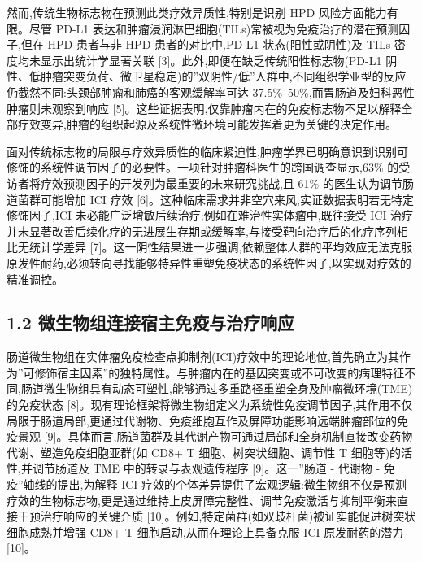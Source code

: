 然而,传统生物标志物在预测此类疗效异质性,特别是识别 HPD 风险方面能力有限。尽管 PD-L1 表达和肿瘤浸润淋巴细胞(TILs)常被视为免疫治疗的潜在预测因子,但在 HPD 患者与非 HPD 患者的对比中,PD-L1 状态(阳性或阴性)及 TILs 密度均未显示出统计学显著关联 {[}3{]}。此外,即便在缺乏传统阳性标志物(PD-L1 阴性、低肿瘤突变负荷、微卫星稳定)的''双阴性/低''人群中,不同组织学亚型的反应仍截然不同:头颈部肿瘤和肺癌的客观缓解率可达 37.5\%--50\%,而胃肠道及妇科恶性肿瘤则未观察到响应 {[}5{]}。这些证据表明,仅靠肿瘤内在的免疫标志物不足以解释全部疗效变异,肿瘤的组织起源及系统性微环境可能发挥着更为关键的决定作用。

面对传统标志物的局限与疗效异质性的临床紧迫性,肿瘤学界已明确意识到识别可修饰的系统性调节因子的必要性。一项针对肿瘤科医生的跨国调查显示,63\% 的受访者将疗效预测因子的开发列为最重要的未来研究挑战,且 61\% 的医生认为调节肠道菌群可能增加 ICI 疗效 {[}6{]}。这种临床需求并非空穴来风,实证数据表明若无特定修饰因子,ICI 未必能广泛增敏后续治疗;例如在难治性实体瘤中,既往接受 ICI 治疗并未显著改善后续化疗的无进展生存期或缓解率,与接受靶向治疗后的化疗序列相比无统计学差异 {[}7{]}。这一阴性结果进一步强调,依赖整体人群的平均效应无法克服原发性耐药,必须转向寻找能够特异性重塑免疫状态的系统性因子,以实现对疗效的精准调控。

\subsection{1.2 微生物组连接宿主免疫与治疗响应}\label{ux5faeux751fux7269ux7ec4ux8fdeux63a5ux5bbfux4e3bux514dux75abux4e0eux6cbbux7597ux54cdux5e94}

肠道微生物组在实体瘤免疫检查点抑制剂(ICI)疗效中的理论地位,首先确立为其作为''可修饰宿主因素''的独特属性。与肿瘤内在的基因突变或不可改变的病理特征不同,肠道微生物组具有动态可塑性,能够通过多重路径重塑全身及肿瘤微环境(TME)的免疫状态 {[}8{]}。现有理论框架将微生物组定义为系统性免疫调节因子,其作用不仅局限于肠道局部,更通过代谢物、免疫细胞互作及屏障功能影响远端肿瘤部位的免疫景观 {[}9{]}。具体而言,肠道菌群及其代谢产物可通过局部和全身机制直接改变药物代谢、塑造免疫细胞亚群(如 CD8+ T 细胞、树突状细胞、调节性 T 细胞等)的活性,并调节肠道及 TME 中的转录与表观遗传程序 {[}9{]}。这一''肠道 - 代谢物 - 免疫''轴线的提出,为解释 ICI 疗效的个体差异提供了宏观逻辑:微生物组不仅是预测疗效的生物标志物,更是通过维持上皮屏障完整性、调节免疫激活与抑制平衡来直接干预治疗响应的关键介质 {[}10{]}。例如,特定菌群(如双歧杆菌)被证实能促进树突状细胞成熟并增强 CD8+ T 细胞启动,从而在理论上具备克服 ICI 原发耐药的潜力 {[}10{]}。

